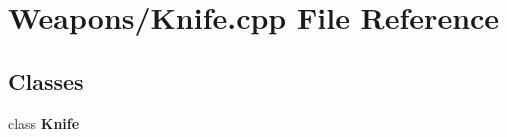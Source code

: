 \section{Weapons/\-Knife.cpp File Reference}
\label{_knife_8cpp}
\subsection*{Classes}
\begin{DoxyCompactItemize}
\item 
class {\bf Knife}
\end{DoxyCompactItemize}

